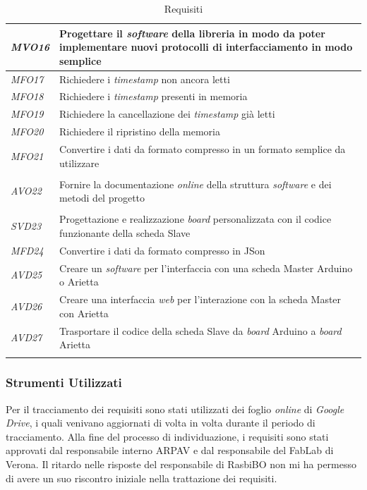 \begin{longtable}{ p{} | p{ }}
 \midrule
\textit{MVO16} & Progettare il \textit{software} della libreria in modo da poter implementare nuovi protocolli di interfacciamento in modo semplice \\
 \midrule
\textit{MFO17} & Richiedere i \textit{timestamp} non ancora letti \\
 \midrule
\textit{MFO18} & Richiedere i \textit{timestamp} presenti in memoria \\
 \midrule
\textit{MFO19} & Richiedere la cancellazione dei \textit{timestamp} già letti \\
 \midrule
\textit{MFO20} & Richiedere il ripristino della memoria \\
 \midrule
\textit{MFO21} & Convertire i dati da formato compresso in un formato semplice da utilizzare \\
 \midrule
\\
 \midrule
\textit{AVO22} & Fornire la documentazione \textit{online} della struttura \textit{software} e dei metodi del progetto \\
 \midrule
\\
 \midrule
\textit{SVD23} & Progettazione e realizzazione \textit{board} personalizzata con il codice funzionante della scheda Slave \\
 \midrule
\textit{MFD24} & Convertire i dati da formato compresso in JSon \\
 \midrule
\textit{AVD25} & Creare un \textit{software} per l'interfaccia con una scheda Master Arduino o Arietta \\
 \midrule
\textit{AVD26} & Creare una interfaccia \textit{web} per l'interazione con la scheda Master con Arietta \\
 \midrule
\textit{AVD27} & Trasportare il codice della scheda Slave da \textit{board} Arduino a \textit{board} Arietta \\
 \bottomrule

\caption{Requisiti}
	

\end{longtable}

\subsubsection{Strumenti Utilizzati}

Per il tracciamento dei requisiti sono stati utilizzati dei foglio \textit{online} di \textit{Google Drive}, i quali venivano aggiornati di volta in volta durante il periodo di tracciamento. Alla fine del processo di individuazione, i requisiti sono stati approvati dal responsabile interno ARPAV e dal responsabile del FabLab di Verona. Il ritardo nelle risposte del responsabile di RasbiBO non mi ha permesso di avere un suo riscontro iniziale nella trattazione dei requisiti.
